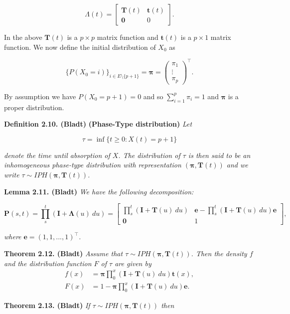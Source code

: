 \documentclass[a4paper,10pt,openany]{book}
\begin{document}
\[
\Lambda(t)=\begin{bmatrix}
\mathbf{T}(t) & \mathbf{t}(t)\\
\mathbf{0} & 0
\end{bmatrix}.
\]

In the above \(\mathbf{T}(t)\) is a \(p\times p\) matrix function and \(\mathbf{t}(t)\) is a \(p\times 1\) matrix function. We now define the initial distribution of \(X_0\) as

\[
\{P(X_0=i)\}_{i\in E\setminus \{p+1\}}=\mathbf{\pi}=\begin{pmatrix}\pi_1\\ \vdots\\ \pi_p\end{pmatrix}^\top.
\]

By assumption we have \(P(X_0=p+1)=0\) and so \(\sum_{i=1}^p\pi_i=1\) and \(\mathbf{\pi}\) is a proper distribution.

\textbf{Definition 2.10. (Bladt)} \textbf{(Phase-Type distribution)} \emph{Let}

\[
\tau = \inf\{t\ge 0 : X(t)=p+1\}
\]

\emph{denote the time until absorption of \(X\). The distribution of \(\tau\) is then said to be an inhomogeneous phase-type distribution with representation \((\mathbf{\pi},\mathbf{T}(t))\) and we write \(\tau \sim IPH(\mathbf{\pi},\mathbf{T}(t))\).}

\textbf{Lemma 2.11. (Bladt)} \emph{We have the following decomposition:}

\[
\mathbf{P}(s,t)=\prod_s^t(\mathbf{I}+\mathbf{\Lambda}(u)\ du)=
\begin{bmatrix}
\prod_s^t(\mathbf{I}+\mathbf{T}(u)\ du) & \mathbf{e} -\prod_s^t(\mathbf{I}+\mathbf{T}(u)\ du)\mathbf{e}\\
\mathbf{0} & 1
\end{bmatrix},
\]

\emph{where \(\mathbf{e}=(1,1,...,1)^\top\).}

\textbf{Theorem 2.12. (Bladt)} \emph{Assume that \(\tau \sim IPH(\mathbf{\pi},\mathbf{T}(t))\). Then the density \(f\) and the distribution function \(F\) of \(\tau\) are given by}
\begin{align*}
f(x)&=\mathbf{\pi}\prod_0^x(\mathbf{I}+\mathbf{T}(u)\ du)\mathbf{t}(x),\\
F(x)&=1-\mathbf{\pi}\prod_0^x(\mathbf{I}+\mathbf{T}(u)\ du)\mathbf{e}.
\end{align*}

\textbf{Theorem 2.13. (Bladt)} \emph{If \(\tau \sim IPH(\mathbf{\pi},\mathbf{T}(t))\) then}
\end{document}
